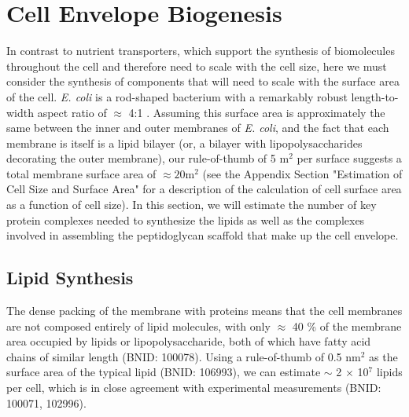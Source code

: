 \section{Cell Envelope Biogenesis}
In contrast to nutrient transporters, which support the synthesis of
biomolecules throughout the cell and therefore need to scale with the cell
size, here we must consider the synthesis of components that will need to
scale with the surface area of the cell. \textit{E. coli} is a rod-shaped
bacterium with a remarkably robust length-to-width aspect ratio of $\approx$
4:1 \citep{harris2018, ojkic2019}. Assuming this surface area is
approximately the same between the inner and outer membranes of \textit{E.
coli}, and the fact that each membrane is itself is a lipid bilayer (or, a
bilayer with lipopolysaccharides decorating the outer membrane), our rule-of-thumb
of 5 \textmu m$^2$ per surface suggests a total membrane surface area of
$\approx 20 $\textmu m$^2$ (see the Appendix Section "Estimation of Cell Size and Surface Area" for a description of the calculation of cell
surface area as a function of cell size). In this section, we will estimate
the number of key protein complexes needed to synthesize the lipids as well
as the complexes involved in assembling the peptidoglycan scaffold that make
up the cell envelope.

\subsection{Lipid Synthesis}
The dense packing of the membrane with proteins means that the cell membranes
are not composed entirely of lipid molecules, with only $\approx$ 40 \% of the
membrane area occupied by lipids or lipopolysaccharide, both of which have fatty
acid chains of similar length (BNID: 100078). Using a rule-of-thumb of 0.5
nm$^2$ as the surface area of the typical lipid (BNID: 106993), we can
estimate $\sim$ 2 $\times$ 10$^7$ lipids per cell, which is in close
agreement with experimental measurements (BNID: 100071, 102996).

